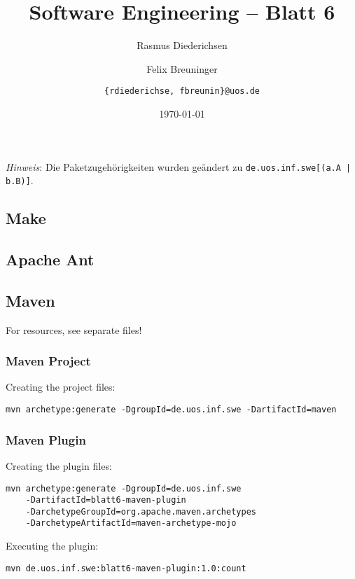 \documentclass{scrartcl}
\title{\rmfamily Software Engineering -- Blatt 6}
\author{Rasmus Diederichsen \and Felix Breuninger\and 
   \texttt{\{rdiederichse, fbreunin\}@uos.de}
}
\date{\today}
\begin{document}
\selectfont
\maketitle

\setcounter{section}{6}
\setcounter{subsection}{0}

\emph{Hinweis}: Die Paketzugehörigkeiten wurden geändert zu \texttt{de.uos.inf.swe[(a.A | b.B)]}.

\subsection{Make}



\subsection{Apache Ant}





\subsection{Maven}
For resources, see separate files!
\subsubsection{Maven Project}
Creating the project files:
\begin{lstlisting}
mvn archetype:generate -DgroupId=de.uos.inf.swe -DartifactId=maven
\end{lstlisting}

\subsubsection{Maven Plugin}
Creating the plugin files:
\begin{lstlisting}
mvn archetype:generate -DgroupId=de.uos.inf.swe 
	-DartifactId=blatt6-maven-plugin 
	-DarchetypeGroupId=org.apache.maven.archetypes
	-DarchetypeArtifactId=maven-archetype-mojo
\end{lstlisting}

Executing the plugin:
\begin{lstlisting}
mvn de.uos.inf.swe:blatt6-maven-plugin:1.0:count
\end{lstlisting}
\end{document}
